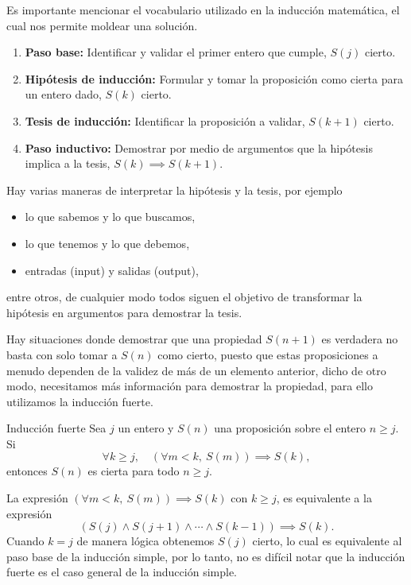 Es importante mencionar el vocabulario utilizado en la inducción matemática, el cual nos permite moldear una solución.
\begin{enumerate}
    \item \textbf{Paso base:} Identificar y validar el primer entero que cumple, $S(j)$ cierto.
    \item \textbf{Hipótesis de inducción:} Formular y tomar la proposición como cierta para un entero dado, $S(k)$ cierto.
    \item \textbf{Tesis de inducción:} Identificar la proposición a validar, $S(k + 1)$ cierto.
    \item \textbf{Paso inductivo:} Demostrar por medio de argumentos que la hipótesis implica a la tesis, $S(k) \implies S(k + 1)$.
\end{enumerate}
Hay varias maneras de interpretar la hipótesis y la tesis, por ejemplo
\begin{itemize}
    \item lo que sabemos y lo que buscamos,
    \item lo que tenemos y lo que debemos,
    \item entradas (input) y salidas (output),
\end{itemize}
entre otros, de cualquier modo todos siguen el objetivo de transformar la hipótesis en argumentos para demostrar la tesis.

Hay situaciones donde demostrar que una propiedad $S(n + 1)$ es verdadera no basta con solo tomar a $S(n)$ como cierto,
puesto que estas proposiciones a menudo dependen de la validez de más de un elemento anterior, dicho de otro modo,
necesitamos más información para demostrar la propiedad, para ello utilizamos la inducción fuerte.
\begin{principle.box}{Inducción fuerte}{}
    Sea $j$ un entero y $S(n)$ una proposición sobre el entero $n \geq j$.
    Si
    \[
        \forall k \geq j, \quad \left(\forall m < k,\ S(m)\right) \implies S(k),
    \]
    entonces $S(n)$ es cierta para todo $n \geq j$.
\end{principle.box}
La expresión $\left(\forall m < k,\ S(m)\right) \implies S(k)$ con $k \geq j$, es equivalente a la expresión
\[
    \left(S(j) \land S(j + 1) \land \cdots \land S(k - 1)\right) \implies S(k).
\]
Cuando $k = j$ de manera lógica obtenemos $S(j)$ cierto, lo cual es equivalente al paso base de la inducción simple,
por lo tanto, no es difícil notar que la inducción fuerte es el caso general de la inducción simple.

